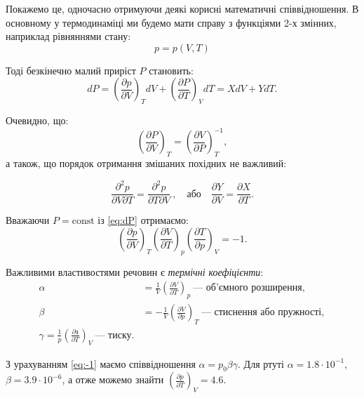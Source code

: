 Покажемо це, одночасно отримуючи деякі корисні математичні співвідношення. В основному у термодинаміці ми будемо мати справу з функціями 2-х змінних, наприклад рівняннями стану:
\begin{equation*}
    p = p(V, T)
\end{equation*}

Тоді безкінечно малий приріст $P$ становить:
\begin{equation}\label{eq:dP}
    dP = \left(\frac{\partial p}{\partial V}\right)_T dV +  \left(\frac{\partial P}{\partial T}\right)_V dT = X dV + YdT.
\end{equation}

Очевидно, що:
\begin{equation*}
    \left(\frac{\partial P}{\partial V}\right)_T = \left(\frac{\partial V}{\partial P}\right)_T^{-1},
\end{equation*}
а також, що порядок отримання змішаних похідних не важливий:

\begin{equation}\label{eq:ddP}
    \frac{\partial^2 p}{\partial V \partial T} = \frac{\partial^2 p}{\partial T \partial V }\ , \quad \text{або}\quad \frac{\partial Y}{\partial V} = \frac{\partial X}{\partial T}.
\end{equation}

Вважаючи $P = \mathrm{const}$ із \eqref{eq:dP} отримаємо:
\begin{equation}\label{eq:-1}
     \left(\frac{\partial p}{\partial V}\right)_T  \left(\frac{\partial V}{\partial T}\right)_p  \left(\frac{\partial T}{\partial p}\right)_V = -1.
\end{equation}


Важливими властивостями речовин є \emph{термічні коефіцієнти}:
\begin{align*}
    \alpha &= \frac1V \left(\frac{\partial V}{\partial T} \right)_p\ \text{--- об’ємного розширення},\\
    \beta &= -\frac1V \left(\frac{\partial V}{\partial p} \right)_T\ \text{--- стиснення або пружності},\\
    \gamma = \frac1p \left(\frac{\partial з}{\partial T} \right)_V\ \text{--- тиску}.
\end{align*}

З урахуванням \eqref{eq:-1} маємо співвідношення $\alpha = p_0\beta\gamma$. Для ртуті $\alpha  = 1.8\cdot 10^{-1}$, $\beta = 3.9\cdot 10^{-6}$, а отже можемо знайти $\left(\frac{\partial p}{\partial T} \right)_V = 4.6$.

